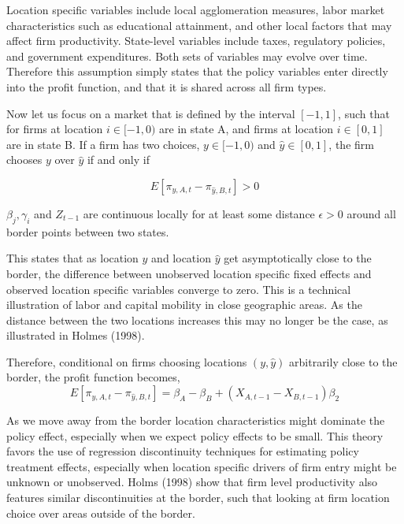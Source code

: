 Location specific variables include local agglomeration measures, labor market characteristics such as educational attainment, and other local factors that may affect firm productivity. State-level variables include taxes, regulatory policies, and government expenditures. Both sets of variables may evolve over time. Therefore this assumption simply states that the policy variables enter directly into the profit function, and that it is shared across all firm types. 

Now let us focus on a market that is defined by the interval $[-1,1]$, such that for firms at location $i \in [-1,0)$ are in state A, and firms at location $i \in [0,1]$ are in state B. If a firm has two choices,  $y \in [-1,0)$ and $\hat y \in [0,1]$, the firm chooses $y$ over $\hat y$ if and only if 

\begin{equation}\label{diff}
E[\pi_{y,A,t}-\pi_{\hat y,B,t}] > 0
\end{equation}

\begin{assumption}\label{cont}
$\beta_{j}, \gamma_{i}$ and $Z_{t-1}$ are continuous locally for at least some distance $\epsilon > 0$ around all border points between two states.
\end{assumption}

This states that as location $y$ and location $\hat y$  get asymptotically close to the border, the difference between unobserved location specific fixed effects and observed location specific variables converge to zero. This is a technical illustration of labor and capital mobility in close geographic areas. As the distance between the two locations increases this may no longer be the case, as illustrated in Holmes (1998). 

Therefore, conditional on firms choosing locations $(y,\hat y)$ arbitrarily close to the border, the profit function becomes,
\begin{equation}\label{prof}
E[\pi_{y,A,t}-\pi_{\hat y, B, t}] =  \beta_{A}-\beta_{B}+(X_{A,t-1}-X_{B,t-1})\beta_{2}
\end{equation}

As we move away from the border location characteristics might dominate the policy effect, especially when we expect policy effects to be small. This theory favors the use of regression discontinuity techniques for estimating policy treatment effects, especially when location specific drivers of firm entry might be unknown or unobserved. Holms (1998) show that firm level productivity also features similar discontinuities at the border, such that looking at firm location choice over areas outside of the border.